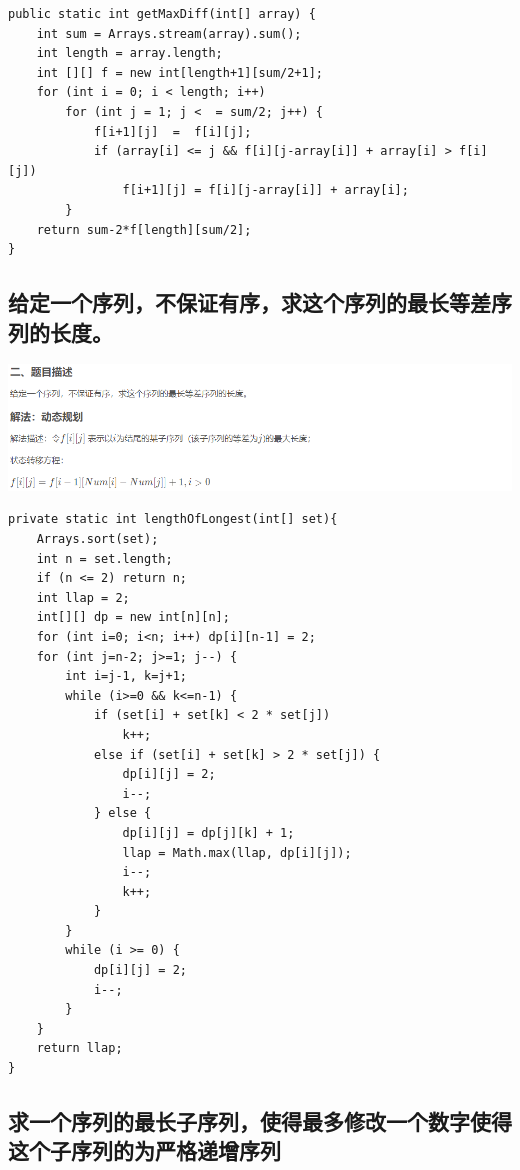 \documentclass[9pt, b5paaper]{book}
\begin{document}
\begin{verbatim}
public static int getMaxDiff(int[] array) {
    int sum = Arrays.stream(array).sum();
    int length = array.length;
    int [][] f = new int[length+1][sum/2+1];
    for (int i = 0; i < length; i++) 
        for (int j = 1; j <  = sum/2; j++) {
            f[i+1][j]  =  f[i][j];
            if (array[i] <= j && f[i][j-array[i]] + array[i] > f[i][j]) 
                f[i+1][j] = f[i][j-array[i]] + array[i];
        }
    return sum-2*f[length][sum/2];
}
\end{verbatim}
\subsection{给定一个序列，不保证有序，求这个序列的最长等差序列的长度。}
\label{sec-1-2-5}

\includegraphics[width=.9\linewidth]{./pic/dpArray2.png}

\begin{verbatim}
private static int lengthOfLongest(int[] set){
    Arrays.sort(set);
    int n = set.length;
    if (n <= 2) return n;
    int llap = 2;
    int[][] dp = new int[n][n];
    for (int i=0; i<n; i++) dp[i][n-1] = 2;
    for (int j=n-2; j>=1; j--) {
        int i=j-1, k=j+1;
        while (i>=0 && k<=n-1) {
            if (set[i] + set[k] < 2 * set[j])
                k++;
            else if (set[i] + set[k] > 2 * set[j]) {
                dp[i][j] = 2;
                i--;
            } else {
                dp[i][j] = dp[j][k] + 1;
                llap = Math.max(llap, dp[i][j]);
                i--;
                k++;
            }
        }
        while (i >= 0) {
            dp[i][j] = 2;
            i--;
        }
    }
    return llap;
}
\end{verbatim}
\subsection{求一个序列的最长子序列，使得最多修改一个数字使得这个子序列的为严格递增序列}
\label{sec-1-2-6}
\end{document}
